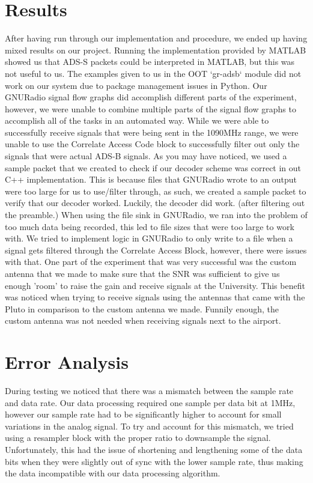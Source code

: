 \documentclass[conference, onecolumn]{IEEEtran}
\begin{document}
\section{Results}
After having run through our implementation and procedure, we ended up having mixed results on our project. Running the implementation provided by MATLAB showed us that ADS-S packets could be interpreted in MATLAB, but this was not useful to us. The examples given to us in the OOT `gr-adsb` module did not work on our system due to package management issues in Python. Our GNURadio signal flow graphs did accomplish different parts of the experiment, however, we were unable to combine multiple parts of the signal flow graphs to accomplish all of the tasks in an automated way. While we were able to successfully receive signals that were being sent in the 1090MHz range, we were unable to use the Correlate Access Code block to successfully filter out only the signals that were actual ADS-B signals. As you may have noticed, we used a sample packet that we created to check if our decoder scheme was correct in out C++ implementation. This is because files that GNURadio wrote to an output were too large for us to use/filter through, as such, we created a sample packet to verify that our decoder worked. Luckily, the decoder did work. (after filtering out the preamble.) When using the file sink in GNURadio, we ran into the problem of too much data being recorded, this led to file sizes that were too large to work with. We tried to implement logic in GNURadio to only write to a file when a signal gets filtered through the Correlate Access Block, however, there were issues with that. One part of the experiment that was very successful was the custom antenna that we made to make sure that the SNR was sufficient to give us enough 'room' to raise the gain and receive signals at the University. This benefit was noticed when trying to receive signals using the antennas that came with the Pluto in comparison to the custom antenna we made. Funnily enough, the custom antenna was not needed when receiving signals next to the airport.


\section{Error Analysis}
During testing we noticed that there was a mismatch between the sample rate and data rate. Our data processing required one sample per data bit at 1MHz, however our sample rate had to be significantly higher to account for small variations in the analog signal. To try and account for this mismatch, we tried using a resampler block with the proper ratio to downsample the signal. Unfortunately, this had the issue of shortening and lengthening some of the data bits when they were slightly out of sync with the lower sample rate, thus making the data incompatible with our data processing algorithm.
\end{document}
